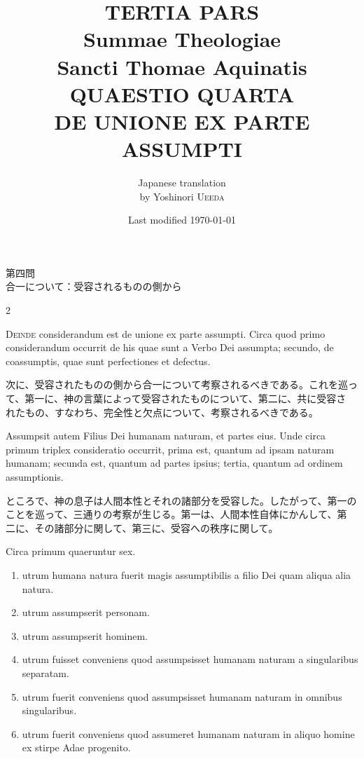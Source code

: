 \documentclass[paper=a4paper,fontsize=10pt,jafontsize=9pt,titlepage]{jlreq}
\title{{\bfseries TERTIA PARS}\\{\Huge Summae Theologiae}\\Sancti Thomae
Aquinatis\\{\sffamily QUAESTIO QUARTA}\\DE UNIONE EX PARTE ASSUMPTI}
\author{Japanese translation\\by Yoshinori {\scshape Ueeda}}
\date{Last modified \today}
\begin{document}
\maketitle
\pagestyle{fancy}


\begin{center}
{\Large 第四問\\合一について：受容されるものの側から}
\end{center}


\begin{paracol}{2}

{\Huge D}{\scshape einde} considerandum est de unione ex parte
 assumpti. Circa quod primo considerandum occurrit de his quae sunt a
 Verbo Dei assumpta; secundo, de coassumptis, quae sunt perfectiones et
 defectus.

\switchcolumn

次に、受容されたものの側から合一について考察されるべきである。これを巡っ
 て、第一に、神の言葉によって受容されたものについて、第二に、共に受容さ
 れたもの、すなわち、完全性と欠点について、考察されるべきである。

\switchcolumn*

Assumpsit autem Filius Dei humanam naturam, et partes eius. Unde circa
 primum triplex consideratio occurrit, prima est, quantum ad ipsam
 naturam humanam; secunda est, quantum ad partes ipsius; tertia, quantum
 ad ordinem assumptionis.

\switchcolumn

ところで、神の息子は人間本性とそれの諸部分を受容した。したがって、第一の
 ことを巡って、三通りの考察が生じる。第一は、人間本性自体にかんして、第
 二に、その諸部分に関して、第三に、受容への秩序に関して。

\switchcolumn*

Circa primum quaeruntur sex. 

\begin{enumerate}
 \item utrum humana natura fuerit magis assumptibilis a filio Dei quam
       aliqua alia natura.
 \item utrum assumpserit personam.
 \item utrum assumpserit hominem.
 \item utrum fuisset conveniens quod assumpsisset humanam naturam a
       singularibus separatam.
 \item utrum fuerit conveniens quod assumpsisset humanam naturam in
       omnibus singularibus.
 \item utrum fuerit conveniens quod assumeret humanam naturam in aliquo homine ex stirpe Adae progenito.
\end{enumerate}


\end{paracol}
\end{document}

